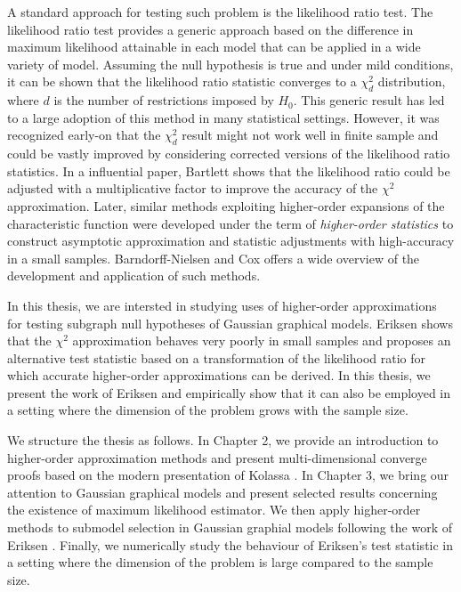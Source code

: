 A standard approach for testing such problem is the likelihood ratio test. The likelihood ratio test provides a generic approach based on the difference in maximum likelihood attainable in each model that can be applied in a wide variety of model. Assuming the null hypothesis is true and under mild conditions, it can be shown that the likelihood ratio statistic converges to a $\chi^2_d$ distribution, where $d$ is the number of restrictions imposed by $H_0$. This generic result has led to a large adoption of this method in many statistical settings. However, it was recognized early-on that the $\chi^2_d$ result might not work well in finite sample and could be vastly improved by considering corrected versions of the likelihood ratio statistics. In a influential paper, Bartlett \cite{bartlett1937properties} shows that the likelihood ratio could be adjusted with a multiplicative factor to improve the accuracy of the $\chi^2$ approximation. Later, similar methods exploiting higher-order expansions of the characteristic function were developed under the term of \textit{higher-order statistics} to construct asymptotic approximation and statistic adjustments with high-accuracy in a small samples. Barndorff-Nielsen and Cox \cite{barndorff1989asymptotic, cox1994inference} offers a wide overview of the development and application of such methods.

In this thesis, we are intersted in studying uses of higher-order approximations for testing  subgraph null hypotheses of Gaussian graphical models. Eriksen \cite{eriksen1996tests} shows that the $\chi^2$ approximation behaves very poorly in small samples and proposes an alternative test statistic based on a transformation of the likelihood ratio for which accurate higher-order approximations can be derived. In this thesis, we present the work of Eriksen and empirically show that it can also be employed in a setting where the dimension of the problem grows with the sample size.

We structure the thesis as follows. In Chapter 2, we provide an introduction to higher-order approximation methods and present multi-dimensional converge proofs based on the modern presentation of Kolassa \cite{kolassa2006series}. In Chapter 3, we bring our attention to Gaussian graphical models and present selected results concerning the existence of maximum likelihood estimator. We then apply higher-order methods to submodel selection in Gaussian graphial models following the work of Eriksen \cite{eriksen1996tests}. Finally, we numerically study the behaviour of Eriksen's test statistic in a setting where the dimension of the problem is large compared to the sample size.